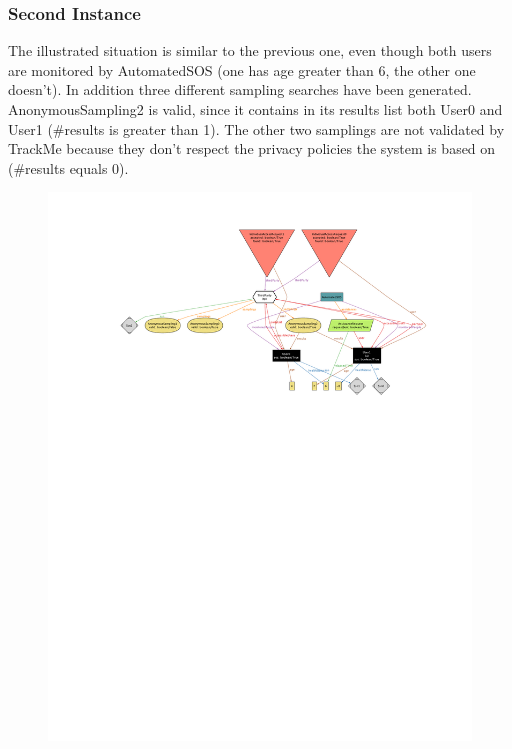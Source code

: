 \documentclass[12pt,a4paper]{article}
\begin{document}
		\subsubsection{Second Instance}
			The illustrated situation is similar to the previous one, even though both users are monitored by AutomatedSOS (one has age greater than 6, the other one doesn't). 
			In addition three different sampling searches have been generated. AnonymousSampling2 is valid, since it contains in its results list both User0 and User1 (\#results is greater than 1). The other two samplings are not validated by TrackMe because they don't respect the privacy policies the system is based on (\#results equals 0).\\
			\begin{figure}[H]
				\centering
				\includegraphics[width=1.25\linewidth]{Images/second-world}
				\label{fig:second-world}
			\end{figure}

	\newpage
\end{document}
